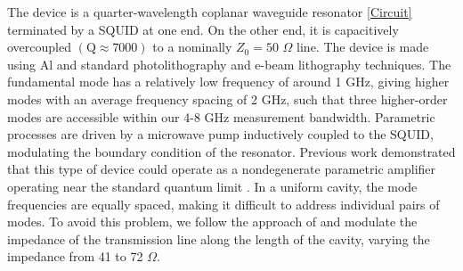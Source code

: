 \documentclass[prl,10pt,twocolumn,superscriptaddress,notitlepage,floatfix,amssymb]{revtex4}
\begin{document}
The device is a quarter-wavelength coplanar waveguide resonator \ref{Circuit} terminated by a SQUID at one end.  On the other end, it is capacitively overcoupled $\left(\text{Q}\approx7000\right)$ to a nominally $Z_0 = 50$ $\Omega$ line.  The device is made using Al and standard photolithography and e-beam lithography techniques. The fundamental mode has a relatively low frequency of around 1 GHz, giving higher modes with an average frequency spacing of 2 GHz, such that three higher-order modes are accessible within our 4-8 GHz measurement bandwidth.  Parametric processes are driven by a microwave pump inductively coupled to the SQUID, modulating the boundary condition of the resonator. Previous work demonstrated that this type of device could operate as a nondegenerate parametric amplifier operating near the standard quantum limit \cite{Simoen:2015by,Wustmann:2013bma,Wustmann:2017vka}. In a uniform cavity, the mode frequencies are equally spaced, making it difficult to address individual pairs of modes. To avoid this problem, we follow the approach of \cite{ZakkaBajjani:2011in} and modulate the impedance of the transmission line along the length of the cavity, varying the impedance from 41 to 72 $\Omega$. %
\end{document}
